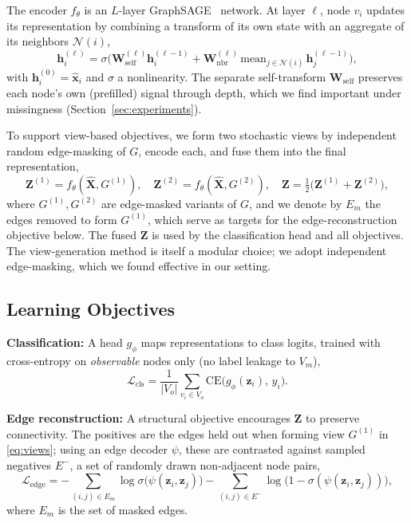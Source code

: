 The encoder $f_\theta$ is an $L$-layer GraphSAGE~\cite{hamilton2017inductive} network. At layer
$\ell$, node $v_i$ updates its representation by combining a transform of its own
state with an aggregate of its neighbors $\mathcal{N}(i)$,
\begin{equation}
    \label{eq:sage}
    \mathbf{h}_i^{(\ell)} = \sigma\!\Big(
        \mathbf{W}_{\text{self}}^{(\ell)}\mathbf{h}_i^{(\ell-1)}
        + \mathbf{W}_{\text{nbr}}^{(\ell)}\,
        \mathrm{mean}_{j\in\mathcal{N}(i)}\,\mathbf{h}_j^{(\ell-1)}
    \Big),
\end{equation}
with $\mathbf{h}_i^{(0)}=\hat{\mathbf{x}}_i$ and $\sigma$ a nonlinearity. The
separate self-transform $\mathbf{W}_{\text{self}}$ preserves each node's own
(prefilled) signal through depth, which we find important under missingness
(Section~\ref{sec:experiments}).

To support view-based objectives, we form two stochastic views by independent
random edge-masking of $G$, encode each, and fuse them into the final
representation,
\begin{equation}
    \label{eq:views}
    \mathbf{Z}^{(1)} = f_\theta(\hat{\mathbf{X}}, G^{(1)}),\quad
    \mathbf{Z}^{(2)} = f_\theta(\hat{\mathbf{X}}, G^{(2)}),\quad
    \mathbf{Z} = \tfrac{1}{2}\big(\mathbf{Z}^{(1)}+\mathbf{Z}^{(2)}\big),
\end{equation}
where $G^{(1)},G^{(2)}$ are edge-masked variants of $G$, and we denote by $E_m$ the edges removed to form $G^{(1)}$, which serve as targets for the edge-reconstruction objective below. The fused $\mathbf{Z}$ is
used by the classification head and all objectives. The view-generation method is itself a modular choice; we adopt independent edge-masking, which we found effective in our setting.

\subsection{Learning Objectives}
\label{sec:method-objectives}

\textbf{Classification:}
A head $g_\phi$ maps representations to class logits, trained with cross-entropy on
\emph{observable} nodes only (no label leakage to $V_m$),
\begin{equation}
    \label{eq:cls}
    \mathcal{L}_{\text{cls}}
    = \frac{1}{|V_o|}\sum_{v_i\in V_o}
      \mathrm{CE}\big(g_\phi(\mathbf{z}_i),\, y_i\big).
\end{equation}

\textbf{Edge reconstruction:}
A structural objective encourages $\mathbf{Z}$ to preserve connectivity. The positives are the edges held out when forming view $G^{(1)}$ in \eqref{eq:views}; using an
edge decoder $\psi$, these are contrasted against sampled
negatives $E^-$, a set of randomly drawn non-adjacent node pairs,
\begin{equation}
    \label{eq:edge}
    \mathcal{L}_{\text{edge}}
    = -\!\!\sum_{(i,j)\in E_m}\!\!\log \sigma\big(\psi(\mathbf{z}_i,\mathbf{z}_j)\big)
      -\!\!\sum_{(i,j)\in E^-}\!\!\log\big(1-\sigma(\psi(\mathbf{z}_i,\mathbf{z}_j))\big),
\end{equation}
where $E_m$ is the set of masked edges.

